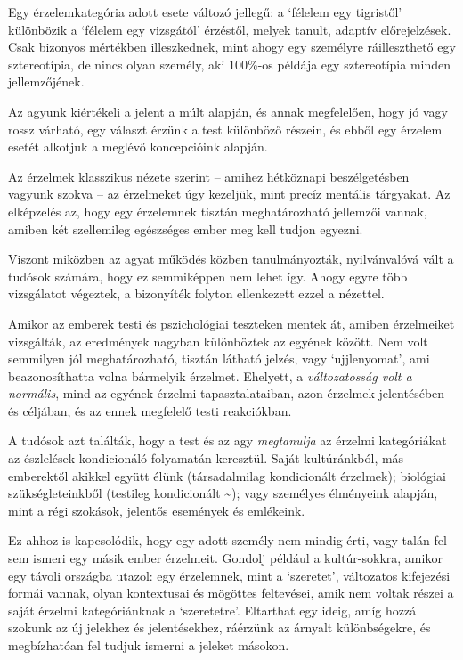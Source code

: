 Egy érzelemkategória adott esete változó jellegű: a `félelem egy
tigristől' különbözik a `félelem egy vizsgától' érzéstől, melyek tanult,
adaptív előrejelzések. Csak bizonyos mértékben illeszkednek, mint ahogy
egy személyre ráilleszthető egy sztereotípia, de nincs olyan személy,
aki 100\%-os példája egy sztereotípia minden jellemzőjének.

Az agyunk kiértékeli a jelent a múlt alapján, és annak megfelelően, hogy
jó vagy rossz várható, egy választ érzünk a test különböző részein, és
ebből egy érzelem esetét alkotjuk a meglévő koncepcióink alapján.


Az érzelmek klasszikus nézete szerint -- amihez hétköznapi
beszélgetésben vagyunk szokva -- az érzelmeket úgy kezeljük, mint precíz
mentális tárgyakat. Az elképzelés az, hogy egy érzelemnek tisztán
meghatározható jellemzői vannak, amiben két szellemileg egészséges ember
meg kell tudjon egyezni.

Viszont miközben az agyat működés közben tanulmányozták, nyilvánvalóvá
vált a tudósok számára, hogy ez semmiképpen nem lehet így. Ahogy egyre
több vizsgálatot végeztek, a bizonyíték folyton ellenkezett ezzel a
nézettel.

Amikor az emberek testi és pszichológiai teszteken mentek át, amiben
érzelmeiket vizsgálták, az eredmények nagyban különböztek az egyének
között. Nem volt semmilyen jól meghatározható, tisztán látható jelzés,
vagy `ujjlenyomat', ami beazonosíthatta volna bármelyik érzelmet.
Ehelyett, a \emph{változatosság volt a normális}, mind az egyének
érzelmi tapasztalataiban, azon érzelmek jelentésében és céljában, és az
ennek megfelelő testi reakciókban.

A tudósok azt találták, hogy a test és az agy \emph{megtanulja} az
érzelmi kategóriákat az észlelések kondicionáló folyamatán keresztül.
Saját kultúránkból, más emberektől akikkel együtt élünk (társadalmilag
kondicionált érzelmek); biológiai szükségleteinkből (testileg
kondicionált \textasciitilde); vagy személyes élményeink alapján, mint a
régi szokások, jelentős események és emlékeink.

\clearpage

Ez ahhoz is kapcsolódik, hogy egy adott személy nem mindig érti, vagy
talán fel sem ismeri egy másik ember érzelmeit. Gondolj például a
kultúr-sokkra, amikor egy távoli országba utazol: egy érzelemnek, mint a
`szeretet', változatos kifejezési formái vannak, olyan kontextusai és
mögöttes feltevései, amik nem voltak részei a saját érzelmi
kategóriánknak a `szeretetre'. Eltarthat egy ideig, amíg hozzá szokunk
az új jelekhez és jelentésekhez, ráérzünk az árnyalt különbségekre, és
megbízhatóan fel tudjuk ismerni a jeleket másokon.

